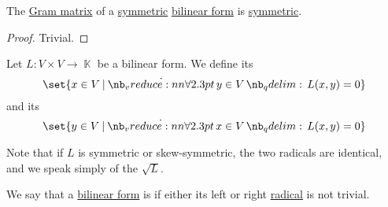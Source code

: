 \begin{proposition}\label{thm:symmetric_bilinear_form_matrix}
  The \hyperref[rem:matrices_as_bilinear_forms]{Gram matrix} of a \hyperref[def:symmetric_function]{symmetric} \hyperref[def:bilinear_form]{bilinear form} is \hyperref[def:transpose_matrix]{symmetric}.
\end{proposition}
\begin{proof}
  Trivial.
\end{proof}

\begin{definition}\label{def:bilinear_form_radicals}
  Let \( L: V \times V \to \BbbK \) be a bilinear form. We define its 
  \begin{equation*}
    \set{ x \in V \given \qforall {y \in V} L(x, y) = 0 }
  \end{equation*}
  and its 
  \begin{equation*}
    \set{ y \in V \given \qforall {x \in V} L(x, y) = 0 }
  \end{equation*}

  Note that if \( L \) is symmetric or skew-symmetric, the two radicals are identical, and we speak simply of the  \( \sqrt L \).
\end{definition}

\begin{definition}\label{def:degenerate_bilinear_form}
  We say that a \hyperref[def:bilinear_form]{bilinear form} is  if either its left or right \hyperref[def:bilinear_form_radicals]{radical} is not trivial.
\end{definition}

